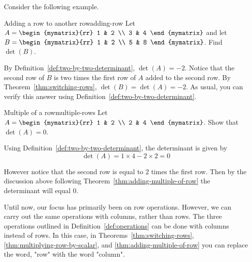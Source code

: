 Consider the following example.

\begin{example}{Adding a row to another row}{adding-row}
  Let $A=\begin{mymatrix}{rr}
    1 & 2 \\
    3 & 4
  \end{mymatrix} $ and let $B=\begin{mymatrix}{rr}
    1 & 2 \\
    5 & 8
  \end{mymatrix}$.
  Find $\det(B)$.
\end{example}

\begin{solution}
  By Definition~\ref{def:two-by-two-determinant}, $\det(A) = -2$.
  Notice that the second row of $B$ is two times the first row of $A$
  added to the second row.  By Theorem~\ref{thm:switching-rows},
  $\det(B) = \det(A) =-2$.  As usual, you can verify this answer
  using Definition~\ref{def:two-by-two-determinant}.
\end{solution}

\begin{example}{Multiple of a row}{multiple-rows}
  Let $A = \begin{mymatrix}{rr}
    1 & 2 \\
    2 & 4
  \end{mymatrix}$. Show that $\det(A) = 0$.
\end{example}

\begin{solution}
  Using Definition~\ref{def:two-by-two-determinant}, the determinant
  is given by
  \begin{equation*}
    \det(A) = 1 \times 4 - 2 \times 2 = 0
  \end{equation*}

  However notice that the second row is equal to $2$ times the first
  row. Then by the discussion above following
  Theorem~\ref{thm:adding-multiple-of-row} the determinant will equal
  $0$.
\end{solution}

Until now, our focus has primarily been on row operations. However, we
can carry out the same operations with columns, rather than rows. The
three operations outlined in Definition~\ref{def:operations} can be
done with columns instead of rows.  In this case, in
Theorems~\ref{thm:switching-rows},
{\ref{thm:multiplying-row-by-scalar}}, and
{\ref{thm:adding-multiple-of-row}} you can replace the word, "row"
with the word "column".

